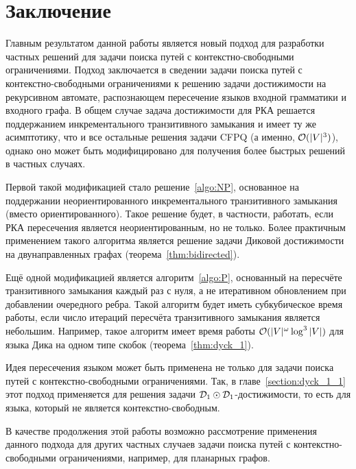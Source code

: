 \section*{Заключение}


Главным результатом данной работы является новый подход для разработки частных решений для задачи поиска путей с контекстно-свободными ограничениями. Подход заключается в сведении задачи поиска путей с контекстно-свободными ограничениями к решению задачи достижимости на рекурсивном автомате, распознающем пересечение языков входной грамматики и входного графа. В общем случае задача достижимости для РКА решается поддержанием инкрементального транзитивного замыкания и имеет ту же асимптотику, что и все остальные решения задачи CFPQ (а именно, $\mathcal{O}(|V|^3)$), однако оно может быть модифицировано для получения более быстрых решений в частных случаях.

Первой такой модификацией стало решение~\ref{algo:NP}, основанное на поддержании неориентированного инкрементального транзитивного замыкания (вместо ориентированного). Такое решение будет, в частности, работать, если РКА пересечения является неориентированным, но не только. Более практичным применением такого алгоритма является решение задачи Диковой достижимости на двунаправленных графах (теорема~\ref{thm:bidirected}). 

Ещё одной модификацией является алгоритм~\ref{algo:P}, основанный на пересчёте транзитивного замыкания каждый раз с нуля, а не итеративном обновлением при добавлении очередного ребра. Такой алгоритм будет иметь субкубическое время работы, если число итераций пересчёта транзитивного замыкания является небольшим. Например, такое алгоритм имеет время работы $\mathcal{O}(|V|^{\omega} \log^3 |V|)$ для языка Дика на одном типе скобок (теорема~\ref{thm:dyck_1}).

Идея пересечения языком может быть применена не только для задачи поиска путей с контекстно-свободными ограничениями. Так, в главе~\ref{section:dyck_1_1} этот подход применяется для решения задачи $\mathcal{D}_1 \odot \mathcal{D}_1$-достижимости, то есть для языка, который не является контекстно-свободным.

В качестве продолжения этой работы возможно рассмотрение применения данного подхода для других частных случаев задачи поиска путей с контекстно-свободными ограничениями, например, для планарных графов.